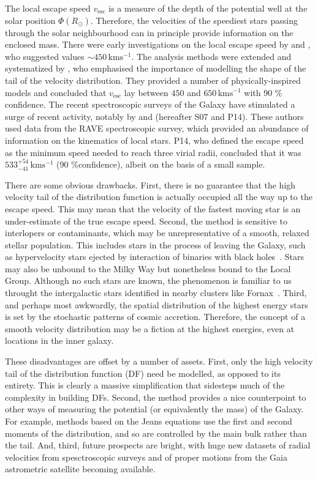 \documentclass[useAMS,twocolumn,usenatbib]{mn2e}
\def\kms{{\,\mathrm{kms^{-1}}}}
\def\vesc{{v_\mathrm{esc}}}
\begin{document}
The local escape speed $\vesc$ is a measure of the depth of the potential well at the solar position $\Phi(R_\odot)$. 
Therefore, the velocities of the speediest stars passing through the solar neighbourhood can in principle provide information on the enclosed mass. 
There were early investigations on the local escape speed by \citet{Ca81} and \citet{Al82}, who suggested values $\sim 450\kms$.
The analysis methods were extended and systematized by \citet{Le90}, who emphasised the importance of modelling the shape of the tail of the velocity distribution. 
They provided a number of physically-inspired models and concluded that $\vesc$ lay between $450$ and $650 \kms$ with 90 \% confidence. 
The recent spectroscopic surveys of the Galaxy have stimulated a surge of recent activity, notably by \cite{Sm07} and \cite{Pi14} (hereafter S07 and P14).
These authors used data from the RAVE spectroscopic survey, which provided an abundance of information on the kinematics of local stars. 
P14, who defined the escape speed as the minimum speed needed to reach three virial radii, concluded that it was $533^{+54}_{-41} \kms$ (90 \%confidence), albeit on the basis of a small sample.

There are some obvious drawbacks. First, there is no guarantee that the high velocity tail of the distribution function is actually occupied all the way up to the escape speed. 
This may mean that the velocity of the fastest moving star is an under-estimate of the true escape speed. 
Second, the method is sensitive to interlopers or contaminants, which may be unrepresentative of a smooth, relaxed stellar population. 
This includes stars in the process of leaving the Galaxy, such as hypervelocity stars ejected by interaction of binaries with black holes~\citep[e.g.,][]{Br15,Bou16}. 
Stars may also be unbound to the Milky Way but nonetheless bound to the Local Group. 
Although no such stars are known, the phenomenon is familiar to us throught the intergalactic stars identified in nearby clusters like Fornax~\citep{Th97}. 
Third, and perhaps most awkwardly, the spatial distribution of the highest energy stars is set by the stochastic patterns of cosmic accretion. 
Therefore, the concept of a smooth velocity distribution may be a fiction at the highest energies, even at locations in the inner galaxy.

These disadvantages are offset by a number of assets. First, only the high velocity tail of the distribution function (DF) need be modelled, as opposed to its entirety. 
This is clearly a massive simplification that sidesteps much of the complexity in building DFs. 
Second, the method provides a nice counterpoint to other ways of measuring the potential (or equivalently the mass) of the Galaxy. 
For example, methods based on the Jeans equations use the first and second moments of the distribution, and so are controlled by the main bulk rather than the tail. 
And, third, future prospects are bright, with huge new datasets of radial velocities from spesctroscopic surveys and of proper motions from the Gaia astrometric satellite becoming available.
\end{document}

